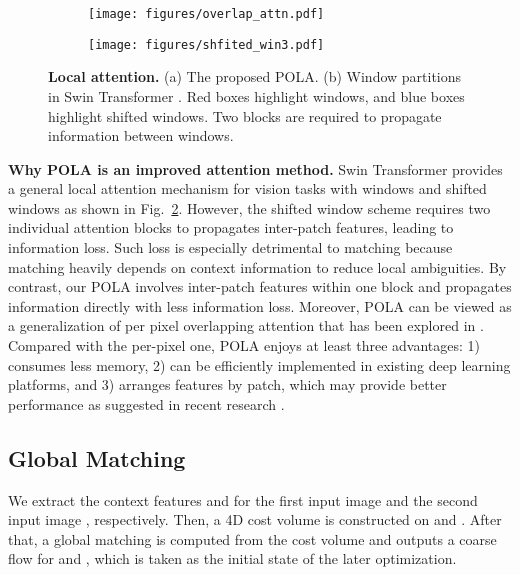 \documentclass[10pt,twocolumn,letterpaper]{article}
\begin{document}
\begin{figure}
  \begin{subfigure}{0.6\linewidth}
    \centering
    \texttt{[image: figures/overlap\_attn.pdf]}
    \caption{}
    \label{fig:overlap_attn}
  \end{subfigure}
  \hfill
  \begin{subfigure}{0.3\linewidth}
    \centering
    \texttt{[image: figures/shfited\_win3.pdf]}
    \caption{}
    \label{fig:shfit_win}
  \end{subfigure}
  \caption{{\bf Local attention.} (a) The proposed POLA.
  (b) Window partitions in Swin Transformer \cite{liu2021swin}. Red boxes highlight windows, and blue boxes highlight shifted windows. Two blocks are required to propagate information between windows.}
  \label{fig:attention}
\end{figure}


{\bf Why POLA is an improved attention method.}
Swin Transformer \cite{liu2021swin} provides a general local attention mechanism for vision tasks with windows and shifted windows as shown in Fig.~\ref{fig:shfit_win}.
However, the shifted window scheme requires two individual attention blocks to propagates inter-patch features, leading to information loss. Such loss is especially detrimental to matching because matching heavily depends on context information to reduce local ambiguities.
By contrast, our POLA involves inter-patch features within one block and propagates information directly with less information loss.
Moreover, POLA can be viewed as a generalization of per pixel overlapping attention that has been explored in \cite{ramachandran2019stand, hu2019local_all}. 
Compared with the per-pixel one, POLA enjoys at least three advantages: 1) consumes less memory, 2) can be efficiently implemented in existing deep learning platforms, and 3) arranges features by patch, which may provide better performance as suggested in recent research \cite{dosovitskiy2021an,liu2021swin,anonymous2022patches}.

\subsection{Global Matching}

We extract the context features  and  for the first input image  and the second input image , respectively. Then, a 4D cost volume is constructed on  and . After that, a global matching is computed from the cost volume and outputs a coarse flow  for  and , which is taken as the initial state of the later optimization.
\end{document}
